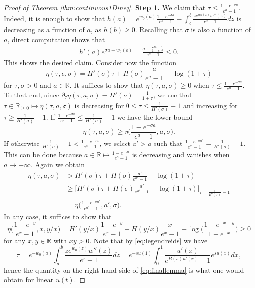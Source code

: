 \documentclass[a4paper,reqno,12pt]{amsart}
\renewcommand{\r}{\mathbb{R}}
\newcommand{\si}{\sigma}
\newcommand{\1}{\bo{1}}
\begin{document}
\begin{proof}[Proof of Theorem \ref{thm:continuous1Dineq}] {\bf Step 1. }
We claim that $\tau \leq \frac{1-e^{-\si a}}{e^{a}-1} $. Indeed, it is enough to show that $h(a)=e^{w_0(a)}\frac{1-e^{-\si a}}{e^{a}-1}-\int_a^b \frac{ze^{w_0(z)}w''(z)}{e^{z}-1}dz$ is decreasing as a function of $a$, as $h(b)\geq 0$. Recalling that $\si$ is also a function of $a$, direct computation shows that
\begin{align*}
	h'(a)e^{\si a-w_0(a)} = \frac{\si - \frac{e^{\si a}-1}{1-e^{-a}}}{e^a-1} \leq 0.
\end{align*}
This shows the desired claim.   Consider now the function 
\[
\eta(\tau,a,\si) =  H'(\si)\tau +H(\si) \frac{a}{e^{a}-1}   - \log (1+\tau)
\]
for $\tau,\si> 0$ and $a\in \r$. It suffices to show that $\eta(\tau,a,\si)  \geq 0$ when $\tau \leq \frac{1-e^{-\si a}}{e^{a}-1} $. To that end,
since $\partial_\tau \eta(\tau,a,\si) = H'(\si)-\frac{1}{1+\tau}$, we see that $\tau\in \r_{\geq 0} \mapsto \eta(\tau,a,\si)$ is decreasing for $0\leq \tau \leq \frac{1}{H'(\si)}-1$ and increasing for $\tau\geq \frac{1}{H'(\si)}-1$. If $\frac{1-e^{-\si a}}{e^{a}-1} \leq \frac{1}{H'(\si)}-1$ we have the lower bound
\[
\eta(\tau,a,\si) \geq \eta\bigg(\frac{1-e^{-\si a}}{e^{a}-1},a,\si\bigg).
\]
If otherwise $\frac{1}{H'(\si)}-1 <\frac{1-e^{-\si a}}{e^{a}-1}$, we select $a'>a$ such that $\frac{1-e^{-\si a'}}{e^{a'}-1}=\frac{1}{H'(\si)}-1$. This can be done because $a\in \r \mapsto \frac{1-e^{-\si a}}{e^{a}-1} $ is decreasing and vanishes when $a\to+\infty$. Again we obtain
\begin{align*}
	\eta(\tau,a,\si) & > H'(\si)\tau +H(\si) \frac{a'}{e^{a'}-1}   - \log (1+\tau) \\
	& \geq \bigg[H'(\si)\tau +H(\si) \frac{a'}{e^{a'}-1}   - \log (1+\tau)\bigg]_{\tau=\frac{1}{H'(\si)}-1} \\
	& = \eta\bigg(\frac{1-e^{-\si a'}}{e^{a'}-1},a',\si\bigg).
\end{align*}
In any case, it suffices to show that
\begin{equation} \label{eq:finallemma}
	\eta\bigg(\frac{1-e^{-y}}{e^{x}-1},x,y/x\bigg) = H'(y/x) \frac{1-e^{-y}}{e^{x}-1} + H(y/x)\frac{x}{e^{x}-1} - \log\Big(\frac{1-e^{-x-y}}{1-e^{-x}}\Big) \geq 0
\end{equation}
for any $x,y\in \r$ with $xy>0$. 
Note that by \eqref{eq:legendreids} we have
$$
\tau = e^{-w_0(a)}\int_a^b \frac{ze^{w_0(z)}w''(z)}{e^{z}-1}dz = e^{-su(1)} \int_0^1 \frac{u'(x)}{e^{B(s)u'(x)}-1}e^{s u(x)}dx,
$$
hence the quantity on the right hand side of \eqref{eq:finallemma} is what one would obtain for linear $u(t)$.



\end{proof}
\end{document}
